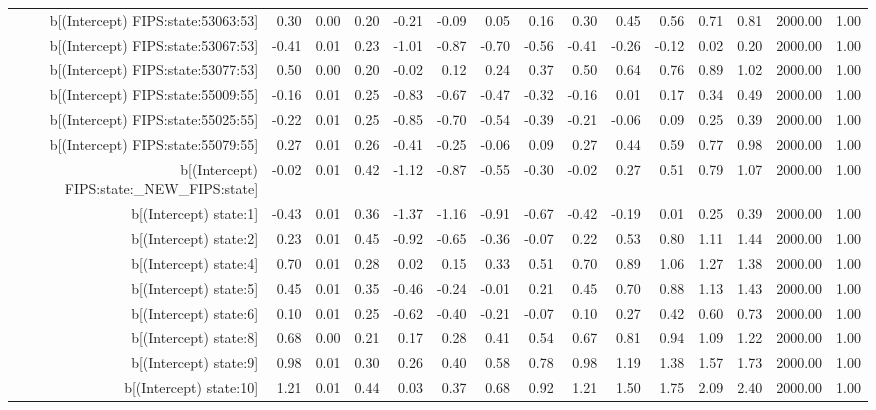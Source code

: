 \begin{table}[ht]
\begin{tabular}{rrrrrrrrrrrrrrr}
  b[(Intercept) FIPS:state:53063:53] & 0.30 & 0.00 & 0.20 & -0.21 & -0.09 & 0.05 & 0.16 & 0.30 & 0.45 & 0.56 & 0.71 & 0.81 & 2000.00 & 1.00 \\ 
  b[(Intercept) FIPS:state:53067:53] & -0.41 & 0.01 & 0.23 & -1.01 & -0.87 & -0.70 & -0.56 & -0.41 & -0.26 & -0.12 & 0.02 & 0.20 & 2000.00 & 1.00 \\ 
  b[(Intercept) FIPS:state:53077:53] & 0.50 & 0.00 & 0.20 & -0.02 & 0.12 & 0.24 & 0.37 & 0.50 & 0.64 & 0.76 & 0.89 & 1.02 & 2000.00 & 1.00 \\ 
  b[(Intercept) FIPS:state:55009:55] & -0.16 & 0.01 & 0.25 & -0.83 & -0.67 & -0.47 & -0.32 & -0.16 & 0.01 & 0.17 & 0.34 & 0.49 & 2000.00 & 1.00 \\ 
  b[(Intercept) FIPS:state:55025:55] & -0.22 & 0.01 & 0.25 & -0.85 & -0.70 & -0.54 & -0.39 & -0.21 & -0.06 & 0.09 & 0.25 & 0.39 & 2000.00 & 1.00 \\ 
  b[(Intercept) FIPS:state:55079:55] & 0.27 & 0.01 & 0.26 & -0.41 & -0.25 & -0.06 & 0.09 & 0.27 & 0.44 & 0.59 & 0.77 & 0.98 & 2000.00 & 1.00 \\ 
  b[(Intercept) FIPS:state:\_NEW\_FIPS:state] & -0.02 & 0.01 & 0.42 & -1.12 & -0.87 & -0.55 & -0.30 & -0.02 & 0.27 & 0.51 & 0.79 & 1.07 & 2000.00 & 1.00 \\ 
  b[(Intercept) state:1] & -0.43 & 0.01 & 0.36 & -1.37 & -1.16 & -0.91 & -0.67 & -0.42 & -0.19 & 0.01 & 0.25 & 0.39 & 2000.00 & 1.00 \\ 
  b[(Intercept) state:2] & 0.23 & 0.01 & 0.45 & -0.92 & -0.65 & -0.36 & -0.07 & 0.22 & 0.53 & 0.80 & 1.11 & 1.44 & 2000.00 & 1.00 \\ 
  b[(Intercept) state:4] & 0.70 & 0.01 & 0.28 & 0.02 & 0.15 & 0.33 & 0.51 & 0.70 & 0.89 & 1.06 & 1.27 & 1.38 & 2000.00 & 1.00 \\ 
  b[(Intercept) state:5] & 0.45 & 0.01 & 0.35 & -0.46 & -0.24 & -0.01 & 0.21 & 0.45 & 0.70 & 0.88 & 1.13 & 1.43 & 2000.00 & 1.00 \\ 
  b[(Intercept) state:6] & 0.10 & 0.01 & 0.25 & -0.62 & -0.40 & -0.21 & -0.07 & 0.10 & 0.27 & 0.42 & 0.60 & 0.73 & 2000.00 & 1.00 \\ 
  b[(Intercept) state:8] & 0.68 & 0.00 & 0.21 & 0.17 & 0.28 & 0.41 & 0.54 & 0.67 & 0.81 & 0.94 & 1.09 & 1.22 & 2000.00 & 1.00 \\ 
  b[(Intercept) state:9] & 0.98 & 0.01 & 0.30 & 0.26 & 0.40 & 0.58 & 0.78 & 0.98 & 1.19 & 1.38 & 1.57 & 1.73 & 2000.00 & 1.00 \\ 
  b[(Intercept) state:10] & 1.21 & 0.01 & 0.44 & 0.03 & 0.37 & 0.68 & 0.92 & 1.21 & 1.50 & 1.75 & 2.09 & 2.40 & 2000.00 & 1.00 \\ 

\end{tabular}
\end{table}
